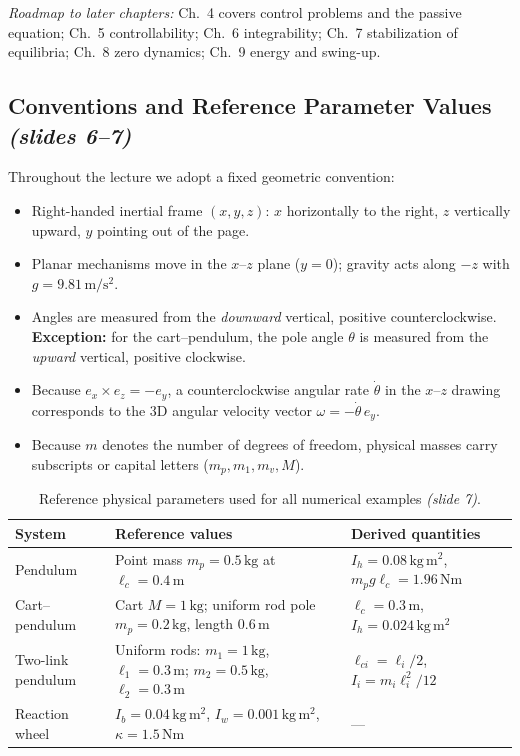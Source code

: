 \documentclass[11pt, a4paper]{article}
\theoremstyle{definition}
\theoremstyle{plain}
\begin{document}
\noindent\emph{Roadmap to later chapters:} Ch.~4 covers control problems and the passive equation; Ch.~5 controllability; Ch.~6 integrability; Ch.~7 stabilization of equilibria; Ch.~8 zero dynamics; Ch.~9 energy and swing-up.

\subsection{Conventions and Reference Parameter Values \emph{(slides 6--7)}}

Throughout the lecture we adopt a fixed geometric convention:
\begin{itemize}
  \item Right-handed inertial frame $(x, y, z)$: $x$ horizontally to the right, $z$ vertically upward, $y$ pointing out of the page.
  \item Planar mechanisms move in the $x$--$z$ plane ($y=0$); gravity acts along $-z$ with $g = 9.81\,\mathrm{m/s^2}$.
  \item Angles are measured from the \emph{downward} vertical, positive counterclockwise. \textbf{Exception:} for the cart--pendulum, the pole angle $\theta$ is measured from the \emph{upward} vertical, positive clockwise.
  \item Because $e_x \times e_z = -e_y$, a counterclockwise angular rate $\dot{\theta}$ in the $x$--$z$ drawing corresponds to the 3D angular velocity vector $\omega = -\dot{\theta}\, e_y$.
  \item Because $m$ denotes the number of degrees of freedom, physical masses carry subscripts or capital letters ($m_p, m_1, m_v, M$).
\end{itemize}

\begin{table}[ht]
\centering
\caption{Reference physical parameters used for all numerical examples \emph{(slide 7)}.}
\label{tab:ref_values}
\renewcommand{\arraystretch}{1.2}
\begin{tabular}{@{}l p{6.8cm} p{4.6cm}@{}}
\toprule
\textbf{System} & \textbf{Reference values} & \textbf{Derived quantities} \\
\midrule
Pendulum & Point mass $m_p = 0.5\,\mathrm{kg}$ at $\ell_c = 0.4\,\mathrm{m}$ & $I_h = 0.08\,\mathrm{kg\,m^2}$, $m_p g \ell_c = 1.96\,\mathrm{Nm}$ \\
Cart--pendulum & Cart $M = 1\,\mathrm{kg}$; uniform rod pole $m_p = 0.2\,\mathrm{kg}$, length $0.6\,\mathrm{m}$ & $\ell_c = 0.3\,\mathrm{m}$, $I_h = 0.024\,\mathrm{kg\,m^2}$ \\
Two-link pendulum & Uniform rods: $m_1 = 1\,\mathrm{kg}$, $\ell_1 = 0.3\,\mathrm{m}$; $m_2 = 0.5\,\mathrm{kg}$, $\ell_2 = 0.3\,\mathrm{m}$ & $\ell_{ci} = \ell_i/2$, $I_i = m_i \ell_i^2 / 12$ \\
Reaction wheel & $I_b = 0.04\,\mathrm{kg\,m^2}$, $I_w = 0.001\,\mathrm{kg\,m^2}$, $\kappa = 1.5\,\mathrm{Nm}$ & --- \\
\bottomrule
\end{tabular}
\end{table}
\end{document}
